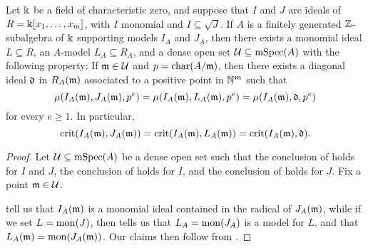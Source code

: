 \documentclass{amsart}
\begin{document}
\begin{corollary}
   \label{invariants associated to a monomial ideal in large characteristic: C}
   Let $\Bbbk$ be a field of characteristic zero, and suppose that $I$ and $J$ are ideals of  $R=\Bbbk[x_1, \ldots, x_m]$, with $I$ monomial and $I \subseteq \sqrt{J}$.
   If $A$ is a finitely generated $\mathbb{Z}$-subalgebra of $\Bbbk$ supporting models $I_A$ and $J_A$, then there exists a monomial ideal $L \subseteq R$, an $A$-model $L_A \subseteq R_A$, and a dense open set $\mathcal{U} \subseteq \operatorname{mSpec}(A)$ with the following property\textup:
   If $\mathfrak{m} \in \mathcal{U}$ and $p = \operatorname{char}(A/\mathfrak{m})$, then there exists a diagonal ideal $\mathfrak{d}$
   in $R_A(\mathfrak{m})$ associated to a positive point in $\mathbb{N}^m$ such that
   \[
      \mu(I_A(\mathfrak{m}), J_A(\mathfrak{m}), p^e) = \mu(I_A(\mathfrak{m}), L_A(\mathfrak{m}), p^e)  = \mu(I_A(\mathfrak{m}), \mathfrak{d}, p^e)
   \]
   for every $e \geq 1$.
   In particular,
   \[
      \operatorname{crit}(I_A(\mathfrak{m}), J_A(\mathfrak{m})) = \operatorname{crit}(I_A(\mathfrak{m}), L_A(\mathfrak{m}))= \operatorname{crit}(I_A(\mathfrak{m}), \mathfrak{d}).
   \]
\end{corollary}

\begin{proof}  Let $\mathcal{U} \subseteq \operatorname{mSpec}(A)$ be a dense open set such that the conclusion of  holds for $I$ and $J$, the conclusion of  holds for $I$, and the conclusion of  holds for $J$.  Fix a point $\mathfrak{m} \in \mathcal{U}$.

 tell us that $I_A(\mathfrak{m})$ is a monomial ideal contained in the radical of $J_A(\mathfrak{m})$, while if we set $L=\operatorname{mon}(J)$, then  tells us that $L_A = \operatorname{mon}(J_A)$ is a model for $L$, and that $L_A(\mathfrak{m}) = \operatorname{mon}(J_A(\mathfrak{m}))$.    Our claims then follow from .
\end{proof}
\end{document}
